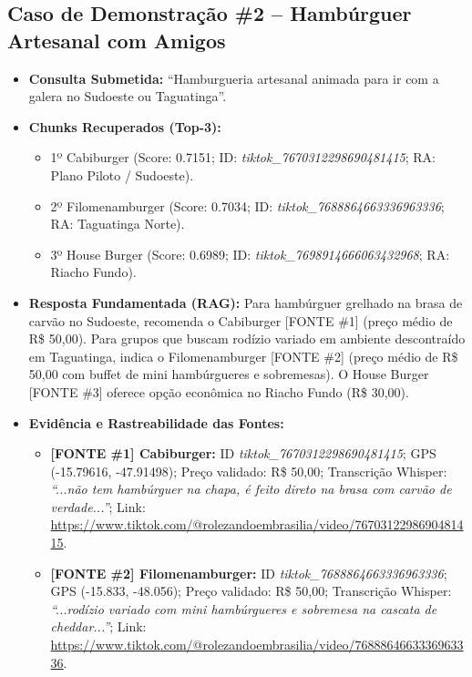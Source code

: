 \documentclass[12pt,a4paper]{article}
\begin{document}
\subsection{Caso de Demonstração \#2 -- Hambúrguer Artesanal com Amigos}
\begin{itemize}[leftmargin=1.0cm]
\item \textbf{Consulta Submetida:} ``Hamburgueria artesanal animada para ir com a galera no Sudoeste ou Taguatinga''.
\item \textbf{Chunks Recuperados (Top-3):}
\begin{itemize}
\item 1º Cabiburger (Score: 0.7151; ID: \textit{tiktok\_7670312298690481415}; RA: Plano Piloto / Sudoeste).
\item 2º Filomenamburger (Score: 0.7034; ID: \textit{tiktok\_7688864663336963336}; RA: Taguatinga Norte).
\item 3º House Burger (Score: 0.6989; ID: \textit{tiktok\_7698914666063432968}; RA: Riacho Fundo).
\end{itemize}
\item \textbf{Resposta Fundamentada (RAG):} Para hambúrguer grelhado na brasa de carvão no Sudoeste, recomenda o Cabiburger [FONTE \#1] (preço médio de R\$ 50,00). Para grupos que buscam rodízio variado em ambiente descontraído em Taguatinga, indica o Filomenamburger [FONTE \#2] (preço médio de R\$ 50,00 com buffet de mini hambúrgueres e sobremesas). O House Burger [FONTE \#3] oferece opção econômica no Riacho Fundo (R\$ 30,00).
\item \textbf{Evidência e Rastreabilidade das Fontes:}
\begin{itemize}
\item \textbf{[FONTE \#1] Cabiburger:} ID \textit{tiktok\_7670312298690481415}; GPS (-15.79616, -47.91498); Preço validado: R\$ 50,00; Transcrição Whisper: \textit{``...não tem hambúrguer na chapa, é feito direto na brasa com carvão de verdade...''}; Link: \url{https://www.tiktok.com/@rolezandoembrasilia/video/7670312298690481415}.
\item \textbf{[FONTE \#2] Filomenamburger:} ID \textit{tiktok\_7688864663336963336}; GPS (-15.833, -48.056); Preço validado: R\$ 50,00; Transcrição Whisper: \textit{``...rodízio variado com mini hambúrgueres e sobremesa na cascata de cheddar...''}; Link: \url{https://www.tiktok.com/@rolezandoembrasilia/video/7688864663336963336}.
\end{itemize}
\end{itemize}
\end{document}
